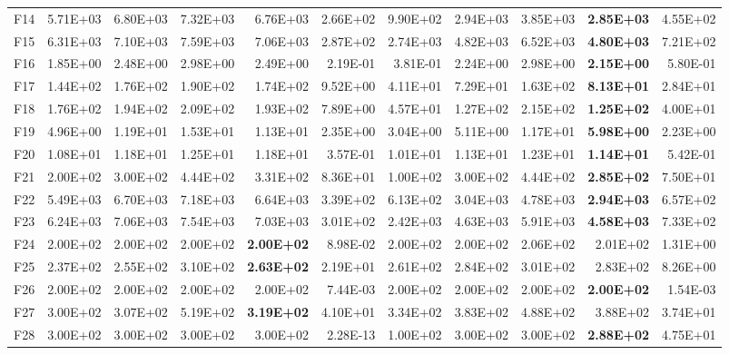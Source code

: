 \begin{tabular}{lrrrrrrrrrr}
F14 & 5.71E+03 & 6.80E+03 & 7.32E+03 & 6.76E+03 & 2.66E+02 & 9.90E+02 & 2.94E+03 & 3.85E+03 & \textbf{2.85E+03} & 4.55E+02 \\
F15 & 6.31E+03 & 7.10E+03 & 7.59E+03 & 7.06E+03 & 2.87E+02 & 2.74E+03 & 4.82E+03 & 6.52E+03 & \textbf{4.80E+03} & 7.21E+02 \\
F16 & 1.85E+00 & 2.48E+00 & 2.98E+00 & 2.49E+00 & 2.19E-01 & 3.81E-01 & 2.24E+00 & 2.98E+00 & \textbf{2.15E+00} & 5.80E-01 \\
F17 & 1.44E+02 & 1.76E+02 & 1.90E+02 & 1.74E+02 & 9.52E+00 & 4.11E+01 & 7.29E+01 & 1.63E+02 & \textbf{8.13E+01} & 2.84E+01 \\
F18 & 1.76E+02 & 1.94E+02 & 2.09E+02 & 1.93E+02 & 7.89E+00 & 4.57E+01 & 1.27E+02 & 2.15E+02 & \textbf{1.25E+02} & 4.00E+01 \\
F19 & 4.96E+00 & 1.19E+01 & 1.53E+01 & 1.13E+01 & 2.35E+00 & 3.04E+00 & 5.11E+00 & 1.17E+01 & \textbf{5.98E+00} & 2.23E+00 \\
F20 & 1.08E+01 & 1.18E+01 & 1.25E+01 & 1.18E+01 & 3.57E-01 & 1.01E+01 & 1.13E+01 & 1.23E+01 & \textbf{1.14E+01} & 5.42E-01 \\
F21 & 2.00E+02 & 3.00E+02 & 4.44E+02 & 3.31E+02 & 8.36E+01 & 1.00E+02 & 3.00E+02 & 4.44E+02 & \textbf{2.85E+02} & 7.50E+01 \\
F22 & 5.49E+03 & 6.70E+03 & 7.18E+03 & 6.64E+03 & 3.39E+02 & 6.13E+02 & 3.04E+03 & 4.78E+03 & \textbf{2.94E+03} & 6.57E+02 \\
F23 & 6.24E+03 & 7.06E+03 & 7.54E+03 & 7.03E+03 & 3.01E+02 & 2.42E+03 & 4.63E+03 & 5.91E+03 & \textbf{4.58E+03} & 7.33E+02 \\
F24 & 2.00E+02 & 2.00E+02 & 2.00E+02 & \textbf{2.00E+02} & 8.98E-02 & 2.00E+02 & 2.00E+02 & 2.06E+02 & 2.01E+02 & 1.31E+00 \\
F25 & 2.37E+02 & 2.55E+02 & 3.10E+02 & \textbf{2.63E+02} & 2.19E+01 & 2.61E+02 & 2.84E+02 & 3.01E+02 & 2.83E+02 & 8.26E+00 \\
F26 & 2.00E+02 & 2.00E+02 & 2.00E+02 & 2.00E+02 & 7.44E-03 & 2.00E+02 & 2.00E+02 & 2.00E+02 & \textbf{2.00E+02} & 1.54E-03 \\
F27 & 3.00E+02 & 3.07E+02 & 5.19E+02 & \textbf{3.19E+02} & 4.10E+01 & 3.34E+02 & 3.83E+02 & 4.88E+02 & 3.88E+02 & 3.74E+01 \\
F28 & 3.00E+02 & 3.00E+02 & 3.00E+02 & 3.00E+02 & 2.28E-13 & 1.00E+02 & 3.00E+02 & 3.00E+02 & \textbf{2.88E+02} & 4.75E+01 \\
\bottomrule
\end{tabular}

